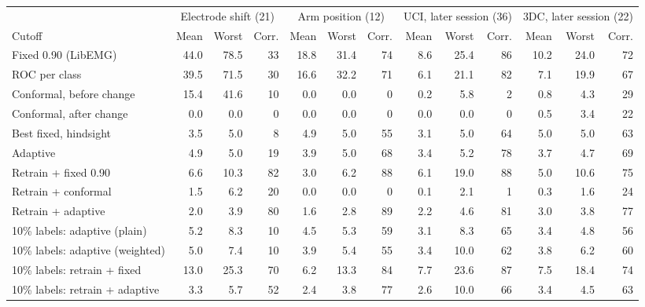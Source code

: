 \begin{tabular}{@{}lrrrrrrrrrrrr@{}}
\toprule
 & \multicolumn{3}{c}{Electrode shift (21)} & \multicolumn{3}{c}{Arm position (12)} & \multicolumn{3}{c}{UCI, later session (36)} & \multicolumn{3}{c}{3DC, later session (22)} \\
\cmidrule(lr){2-4}\cmidrule(lr){5-7}\cmidrule(lr){8-10}\cmidrule(lr){11-13}
Cutoff & Mean & Worst & Corr. & Mean & Worst & Corr. & Mean & Worst & Corr. & Mean & Worst & Corr. \\
\midrule
Fixed 0.90 (LibEMG) & 44.0 & 78.5 & 33 & 18.8 & 31.4 & 74 & 8.6 & 25.4 & 86 & 10.2 & 24.0 & 72 \\
ROC per class & 39.5 & 71.5 & 30 & 16.6 & 32.2 & 71 & 6.1 & 21.1 & 82 & 7.1 & 19.9 & 67 \\
Conformal, before change & 15.4 & 41.6 & 10 & 0.0 & 0.0 & 0 & 0.2 & 5.8 & 2 & 0.8 & 4.3 & 29 \\
Conformal, after change & 0.0 & 0.0 & 0 & 0.0 & 0.0 & 0 & 0.0 & 0.0 & 0 & 0.5 & 3.4 & 22 \\
Best fixed, hindsight & 3.5 & 5.0 & 8 & 4.9 & 5.0 & 55 & 3.1 & 5.0 & 64 & 5.0 & 5.0 & 63 \\
Adaptive & 4.9 & 5.0 & 19 & 3.9 & 5.0 & 68 & 3.4 & 5.2 & 78 & 3.7 & 4.7 & 69 \\
\midrule
Retrain + fixed 0.90 & 6.6 & 10.3 & 82 & 3.0 & 6.2 & 88 & 6.1 & 19.0 & 88 & 5.0 & 10.6 & 75 \\
Retrain + conformal & 1.5 & 6.2 & 20 & 0.0 & 0.0 & 0 & 0.1 & 2.1 & 1 & 0.3 & 1.6 & 24 \\
Retrain + adaptive & 2.0 & 3.9 & 80 & 1.6 & 2.8 & 89 & 2.2 & 4.6 & 81 & 3.0 & 3.8 & 77 \\
\midrule
10\% labels: adaptive (plain) & 5.2 & 8.3 & 10 & 4.5 & 5.3 & 59 & 3.1 & 8.3 & 65 & 3.4 & 4.8 & 56 \\
10\% labels: adaptive (weighted) & 5.0 & 7.4 & 10 & 3.9 & 5.4 & 55 & 3.4 & 10.0 & 62 & 3.8 & 6.2 & 60 \\
10\% labels: retrain + fixed & 13.0 & 25.3 & 70 & 6.2 & 13.3 & 84 & 7.7 & 23.6 & 87 & 7.5 & 18.4 & 74 \\
10\% labels: retrain + adaptive & 3.3 & 5.7 & 52 & 2.4 & 3.8 & 77 & 2.6 & 10.0 & 66 & 3.4 & 4.5 & 63 \\
\bottomrule
\end{tabular}
